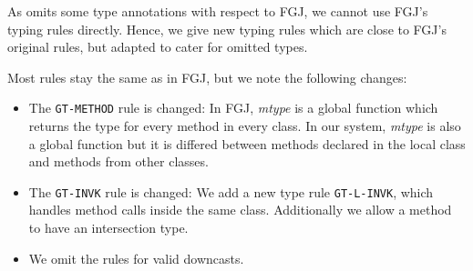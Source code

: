 As \TFGJ omits some type annotations with respect to FGJ, we cannot use
FGJ's typing rules directly. Hence, we give new typing rules which are
close to FGJ's original rules, but adapted to cater for omitted types.



Most rules stay the same as in FGJ, but we note the following changes:
\begin{itemize}
\item The \texttt{GT-METHOD} rule is changed:
In FGJ, \textit{mtype} is a global function which returns the type for every method in every class.
In our system, \textit{mtype} is also a global function but it is differed between
methods declared in the local class and methods from other classes.
\item The \texttt{GT-INVK} rule is changed:
We add a new type rule \texttt{GT-L-INVK}, which handles method calls inside the same class.
Additionally we allow a method to have an intersection type.
\item We omit the rules for valid downcasts.


\end{itemize}

